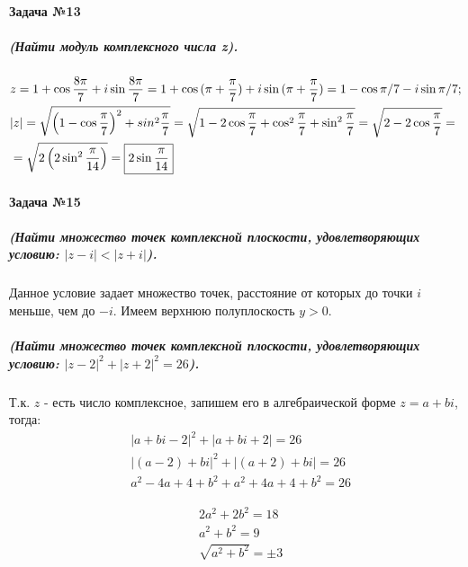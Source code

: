 \documentclass[a4paper,12pt]{report}
\begin{document}
\paragraph{Задача №13}
\subparagraph{(Найти модуль комплексного числа z).}

\begin{align*}
	&z=1+\cos{\dfrac{8\pi}{7}}+i\sin{\dfrac{8\pi}{7}}=	
	1+\cos{(\pi+\dfrac{\pi}{7})}+i\sin{(\pi+\dfrac{\pi}{7})}=	
	1-\cos\pi/7-i\sin\pi/7;\\
	&|z|=\sqrt{\left(1-\cos{\dfrac{\pi}{7}}\right)^2+sin^2{\dfrac{\pi}{7}}}=
	\sqrt{1-2\cos{\dfrac{\pi}{7}}+
	\cos^2{\dfrac{\pi}{7}}+\sin^2\dfrac{\pi}{7}}=
	\sqrt{2-2\cos{\dfrac{\pi}{7}}}=\\
	&=\sqrt{2\left(2\sin^2{\dfrac{\pi}{14}}\right)}=
	\fbox{$ 2\sin{\dfrac{\pi}{14}} $}
\end{align*}
 
\paragraph{Задача №15}
\subparagraph{(Найти множество точек комплексной плоскости, удовлетворяющих условию: $ |z-i|<|z+i| $).} 
Данное условие задает множество точек, расстояние от которых 
до точки $ i $ меньше, чем до $ -i $. Имеем верхнюю полуплоскость $ y>0 $.

\subparagraph{(Найти множество точек комплексной плоскости, удовлетворяющих условию: $ |z-2|^2+|z+2|^2=26 $).\\}
Т.к. $ z $ - есть число комплексное, запишем его в алгебраической форме
$ z=a+bi $, тогда:
\begin{align*}
	&|a+bi-2|^2+|a+bi+2|=26\\
	&|(a-2)+bi|^2+|(a+2)+bi|=26\\	
	&a^2-4a+4+b^2+a^2+4a+4+b^2=26
\end{align*}


\begin{align*}
	&2a^2+2b^2=18\\
	&a^2+b^2=9\\
	&\sqrt{a^2+b^2}=\pm 3
\end{align*}
\end{document}
